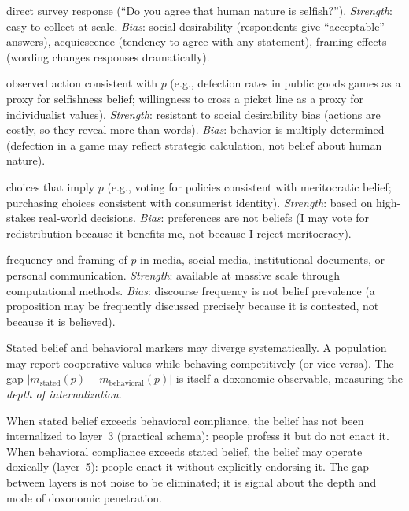\begin{description}[nosep]
  \item[Stated belief:] direct survey response (``Do you agree that human nature is selfish?'').
  \textit{Strength}: easy to collect at scale.
  \textit{Bias}: social desirability (respondents give ``acceptable'' answers), acquiescence (tendency to agree with any statement), framing effects (wording changes responses dramatically).

  \item[Behavioral marker:] observed action consistent with $p$ (e.g., defection rates in public goods games as a proxy for selfishness belief; willingness to cross a picket line as a proxy for individualist values).
  \textit{Strength}: resistant to social desirability bias (actions are costly, so they reveal more than words).
  \textit{Bias}: behavior is multiply determined (defection in a game may reflect strategic calculation, not belief about human nature).

  \item[Revealed preference:] choices that imply $p$ (e.g., voting for policies consistent with meritocratic belief; purchasing choices consistent with consumerist identity).
  \textit{Strength}: based on high-stakes real-world decisions.
  \textit{Bias}: preferences are not beliefs (I may vote for redistribution because it benefits me, not because I reject meritocracy).

  \item[Textual indicator:] frequency and framing of $p$ in media, social media, institutional documents, or personal communication.
  \textit{Strength}: available at massive scale through computational methods.
  \textit{Bias}: discourse frequency is not belief prevalence (a proposition may be frequently discussed precisely because it is contested, not because it is believed).
\end{description}

\begin{proposition}
\label{prop:divergence}
Stated belief and behavioral markers may diverge systematically.
A population may report cooperative values while behaving competitively (or vice versa).
The gap $|m_{\text{stated}}(p) - m_{\text{behavioral}}(p)|$ is itself a doxonomic observable, measuring the \emph{depth of internalization}.
\end{proposition}

\begin{remark}
\label{rem:divergence-as-data}
When stated belief exceeds behavioral compliance, the belief has not been internalized to layer~3 (practical schema): people profess it but do not enact it.
When behavioral compliance exceeds stated belief, the belief may operate doxically (layer~5): people enact it without explicitly endorsing it.
The gap between layers is not noise to be eliminated; it is signal about the depth and mode of doxonomic penetration.
\end{remark}

